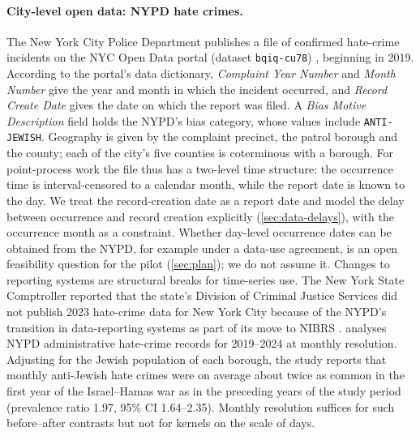 \paragraph{City-level open data: NYPD hate crimes.}
The New York City Police Department publishes a file of confirmed hate-crime
incidents on the NYC Open Data portal (dataset \texttt{bqiq-cu78})
\citep{nypdhate}, beginning in 2019. According to the portal's data
dictionary, \emph{Complaint Year Number} and \emph{Month Number} give the
year and month in which the incident occurred, and \emph{Record Create Date}
gives the date on which the report was filed. A \emph{Bias Motive
Description} field holds the NYPD's bias category, whose values include
\texttt{ANTI-JEWISH}. Geography is given by the complaint precinct, the
patrol borough and the county; each of the city's five counties is
coterminous with a borough. For point-process work the file thus has a
two-level time structure: the occurrence time is interval-censored to a
calendar month, while the report date is known to the day. We treat the
record-creation date as a report date and model the delay between occurrence
and record creation explicitly (\cref{sec:data-delays}), with the
occurrence month as a constraint. Whether day-level occurrence dates can be
obtained from the NYPD, for example under a data-use agreement, is an open
feasibility question for the pilot (\cref{sec:plan}); we do not assume it.
Changes to reporting systems are structural breaks for time-series use. The
New York State Comptroller reported that the state's Division of Criminal
Justice Services did not publish 2023 hate-crime data for New York City
because of the NYPD's transition in data-reporting systems as part of its
move to NIBRS \citep{osc2024hate}.  analyses NYPD
administrative hate-crime records for 2019--2024 at monthly resolution.
Adjusting for the Jewish population of each borough, the study reports
that monthly anti-Jewish hate crimes were on average about twice as common
in the first year of the Israel--Hamas war as in the preceding years of the
study period (prevalence ratio 1.97, 95\% CI 1.64--2.35). Monthly
resolution suffices for such before--after contrasts but not for kernels
on the scale of days.

